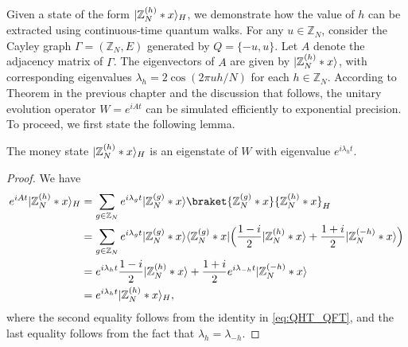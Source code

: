 \documentclass[12pt]{report}
\begin{document}
    Given a state of the form $\lvert\mathbb{Z}_N^{(h)} * x\rangle_H$, we demonstrate how the value of $h$ can be extracted using continuous-time quantum walks. For any $u \in \mathbb{Z}_N$, consider the Cayley graph $\Gamma = (\mathbb{Z}_N, E)$ generated by $Q = {\{-u, u}\}$. Let $A$ denote the adjacency matrix of $\Gamma$. The eigenvectors of $A$ are given by $\lvert\mathbb{Z}_N^{(h)} * x\rangle$, with corresponding eigenvalues $\lambda_h = 2\cos(2\pi uh / N)$ for each $h \in \mathbb{Z}_N$. According to Theorem in the previous chapter and the discussion that follows, the unitary evolution operator $W = e^{iAt}$ can be simulated efficiently to exponential precision. To proceed, we first state the following lemma.




    \begin{lemma}
        \label{lem:h-eigen}
        The money state $\lvert\mathbb{Z}_N^{(h)} * x\rangle_H$ is an eigenstate of $W$ with eigenvalue $e^{i\lambda_h t}$.
    \end{lemma}
    \begin{proof}
        We have 
        \begin{align*}
            e^{iAt} \ket{\mathbb{Z}_N^{(h)} * x}_H
            & = \sum_{g \in \mathbb{Z}_N} e^{i\lambda_gt} \ket{\mathbb{Z}_N^{(g)} * x} \braket{\mathbb{Z}_N^{(g)} * x}{\mathbb{Z}_N^{(h)} * x}_H \\
            & = \sum_{g \in \mathbb{Z}_N} e^{i\lambda_gt} \ket{\mathbb{Z}_N^{(g)} * x} \bra{\mathbb{Z}_N^{(g)} * x} \Big( \frac{1 - i}{2} \ket{\mathbb{Z}_N^{(h)} * x} + \frac{1 + i}{2} \ket{\mathbb{Z}_N^{(-h)} * x} \Big) \\
            & = e^{i\lambda_{h}t} \frac{1 - i}{2} \ket{\mathbb{Z}_N^{(h)} * x} + \frac{1 + i}{2} e^{i\lambda_{-h}t} \ket{\mathbb{Z}_N^{(-h)} * x} \\
            & = e^{i\lambda_{h}t} \ket{\mathbb{Z}_N^{(h)} * x}_H,
        \end{align*}
        where the second equality follows from the identity in \eqref{eq:QHT_QFT}, and the last equality follows from the fact that $\lambda_h = \lambda_{-h}$.
    \end{proof}
\end{document}
